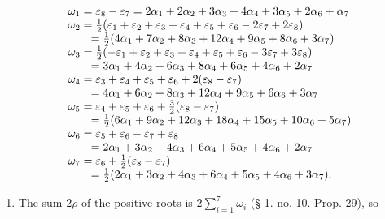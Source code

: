 \[
\begin{array}{r l} & {\omega_ {1} = \varepsilon_ {8} - \varepsilon_ {7} = 2 \alpha_ {1} + 2 \alpha_ {2} + 3 \alpha_ {3} + 4 \alpha_ {4} + 3 \alpha_ {5} + 2 \alpha_ {6} + \alpha_ {7}} \\ & {\omega_ {2} = \frac {1}{2} (\varepsilon_ {1} + \varepsilon_ {2} + \varepsilon_ {3} + \varepsilon_ {4} + \varepsilon_ {5} + \varepsilon_ {6} - 2 \varepsilon_ {7} + 2 \varepsilon_ {8})} \\ & {\qquad = \frac {1}{2} (4 \alpha_ {1} + 7 \alpha_ {2} + 8 \alpha_ {3} + 12 \alpha_ {4} + 9 \alpha_ {5} + 8 \alpha_ {6} + 3 \alpha_ {7})} \\ & {\omega_ {3} = \frac {1}{2} (- \varepsilon_ {1} + \varepsilon_ {2} + \varepsilon_ {3} + \varepsilon_ {4} + \varepsilon_ {5} + \varepsilon_ {6} - 3 \varepsilon_ {7} + 3 \varepsilon_ {8})} \\ & {\qquad = 3 \alpha_ {1} + 4 \alpha_ {2} + 6 \alpha_ {3} + 8 \alpha_ {4} + 6 \alpha_ {5} + 4 \alpha_ {6} + 2 \alpha_ {7}} \\ & {\omega_ {4} = \varepsilon_ {3} + \varepsilon_ {4} + \varepsilon_ {5} + \varepsilon_ {6} + 2 (\varepsilon_ {8} - \varepsilon_ {7})} \\ & {\qquad = 4 \alpha_ {1} + 6 \alpha_ {2} + 8 \alpha_ {3} + 12 \alpha_ {4} + 9 \alpha_ {5} + 6 \alpha_ {6} + 3 \alpha_ {7}} \\ & {\omega_ {5} = \varepsilon_ {4} + \varepsilon_ {5} + \varepsilon_ {6} + \frac {3}{2} (\varepsilon_ {8} - \varepsilon_ {7})} \\ & {\qquad = \frac {1}{2} (6 \alpha_ {1} + 9 \alpha_ {2} + 12 \alpha_ {3} + 18 \alpha_ {4} + 15 \alpha_ {5} + 10 \alpha_ {6} + 5 \alpha_ {7})} \\ & {\omega_ {6} = \varepsilon_ {5} + \varepsilon_ {6} - \varepsilon_ {7} + \varepsilon_ {8}} \\ & {\qquad = 2 \alpha_ {1} + 3 \alpha_ {2} + 4 \alpha_ {3} + 6 \alpha_ {4} + 5 \alpha_ {5} + 4 \alpha_ {6} + 2 \alpha_ {7}} \\ & {\omega_ {7} = \varepsilon_ {6} + \frac {1}{2} (\varepsilon_ {8} - \varepsilon_ {7})} \\ & {\qquad = \frac {1}{2} (2 \alpha_ {1} + 3 \alpha_ {2} + 4 \alpha_ {3} + 6 \alpha_ {4} + 5 \alpha_ {5} + 4 \alpha_ {6} + 3 \alpha_ {7}).} \end{array}
\]

\begin{enumerate}
\def\labelenumi{(\Roman{enumi})}
\setcounter{enumi}{6}
\tightlist
\item
  The sum \(2\rho\) of the positive roots is \(2\sum_{i=1}^{7}\omega_i\) (§ 1. no. 10. Prop. 29), so
\end{enumerate}

